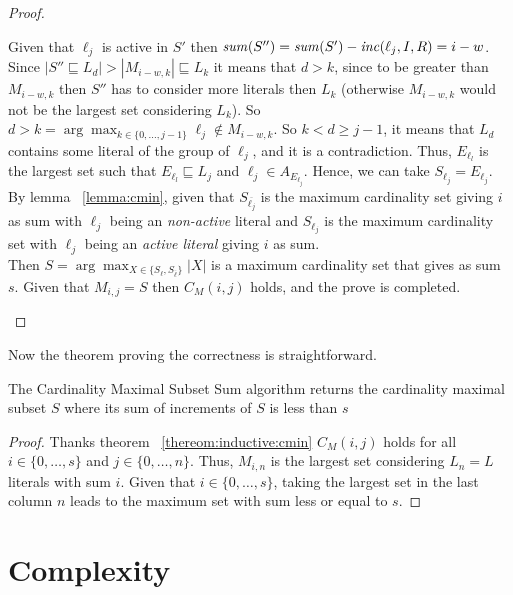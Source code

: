 \begin{proof}
\begin{itemize}
\begin{itemize}
            Given that $\ell_j$ is active in $S'$ then $\mathit{sum}(S'') = \mathit{sum}(S') - \mathit{inc}(\ell_j,I,R) = i - w$.
            Since $|S'' \sqsubseteq L_d| > |M_{i-w,k}| \sqsubseteq L_k $ it means that
            $d > k$, since to be greater than $M_{i-w,k}$ then $S''$ 
            has to consider more literals then $L_k$ (otherwise $M_{i-w,k}$ would not be the largest set considering $L_k$).
            So $d > k = \arg \max_{k \in \{0,\hdots,j-1\}} \ell_j \not\in M_{i-w,k}$.
            So $k < d \ge j-1$, it means that $L_d$ contains some literal of the group of $\ell_j$,
            and it is a contradiction.
            Thus, $E_{\ell_l}$ is the largest set such that $E_{\ell_l} \sqsubseteq L_j$ and $\ell_j \in A_{E_{\ell_j}}$.
            Hence, we can take $S_{\ell_j} = E_{\ell_j}$.
            By lemma ~\ref{lemma:cmin}, given that $S_{\overline{\ell_j}}$ is the maximum cardinality set giving $i$ as sum with $\ell_j$ 
            being an \textit{non-active} literal
            and $S_{\ell_j}$ is the maximum cardinality set with $\ell_j$ being an \textit{active literal} giving $i$  as sum.\\
            Then $S = \arg\max_{X \in \{S_{\ell}, S_{\overline{\ell}}\}} |X|$  is a maximum cardinality set that gives as sum $s$.
            Given that $M_{i,j} = S$ then $C_M(i,j)$ holds, and the prove is completed.
    \end{itemize}
   \end{itemize}
\end{proof}

Now the theorem proving the correctness is straightforward.
\begin{theorem}
    \label{theorem:cardinality:maximal}
    The Cardinality Maximal Subset Sum algorithm returns the cardinality maximal subset $S$ where its sum 
    of increments of $S$ is less than $s$
\end{theorem}

\begin{proof}
    Thanks theorem ~\ref{thereom:inductive:cmin} $C_M(i,j)$ holds for all $i \in \{0, \hdots, s\}$
    and $j \in \{0, \hdots, n\}$.
    Thus, $M_{i,n}$ is the largest set considering $L_n = L$ literals with sum $i$.
    Given that $i \in \{0, \hdots, s\}$, taking the largest set in the last column $n$ leads to the maximum set with sum less or equal 
    to $s$.
\end{proof}

\section{Complexity}
\label{sec:complexity}

